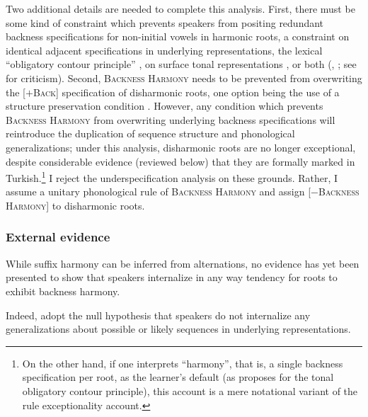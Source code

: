 Two additional details are needed to complete this analysis. First, there must be some kind of constraint which prevents speakers from positing redundant backness specifications for non-initial vowels in harmonic roots, a constraint on identical adjacent specifications in underlying representations, the lexical ``obligatory contour principle'' \citep[][OCP]{Leben1973}, on surface tonal representations \citep{Goldsmith1976}, or both (\citealp{Leben1978}, \citealp{McCarthy1986}; see \citealp{Odden1986,Odden1988} for criticism). Second, \textsc{Backness Harmony} needs to be prevented from overwriting the [$+$\textsc{Back}] specification of disharmonic roots, one option being the use of a structure preservation condition \citep{Kiparsky1985}. However, any condition which prevents \textsc{Backness Harmony} from overwriting underlying backness specifications will reintroduce the duplication of sequence structure and phonological generalizations; under this analysis, disharmonic roots are no longer exceptional, despite considerable evidence (reviewed below) that they are formally marked in Turkish.\footnote{On the other hand, if one interprets ``harmony'', that is, a single backness specification per root, as the learner's default (as \citealp{Odden1986} proposes for the tonal obligatory contour principle), this account is a mere notational variant of the rule exceptionality account.}
I reject the underspecification analysis on these grounds. Rather, I assume a unitary phonological rule of \textsc{Backness Harmony} and assign [$-$\textsc{Backness Harmony}] to disharmonic roots.

\subsubsection{External evidence}
\label{backharmexternal}

While suffix harmony can be inferred from alternations, no evidence has yet been presented to show that speakers internalize in any way tendency for roots to exhibit backness harmony. 


Indeed, \citeauthor{PE} adopt the null hypothesis that speakers do not internalize any generalizations about possible or likely sequences in underlying representations.

